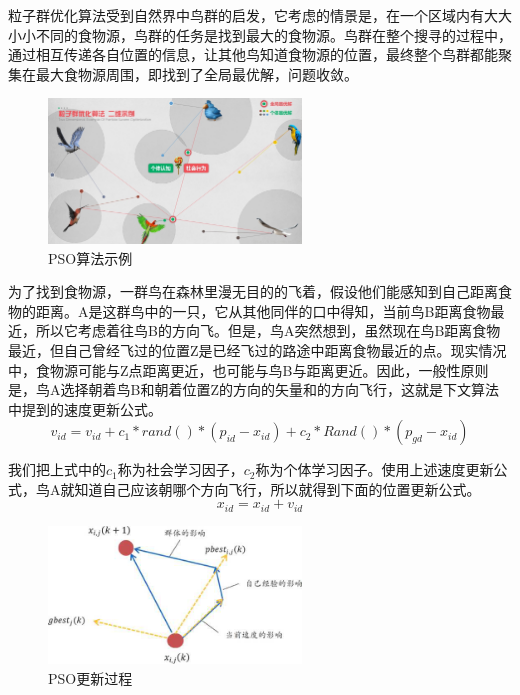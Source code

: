 \documentclass[lang=cn,12pt,a4paper,cite=authoryear]{elegantpaper}
\begin{document}
粒子群优化算法受到自然界中鸟群的启发，它考虑的情景是，在一个区域内有大大小小不同的食物源，鸟群的任务是找到最大的食物源。鸟群在整个搜寻的过程中，通过相互传递各自位置的信息，让其他鸟知道食物源的位置，最终整个鸟群都能聚集在最大食物源周围，即找到了全局最优解，问题收敛。


\begin{figure}[H]
	\centering
	\includegraphics[width=0.6\textwidth]{image/psointro.png}
	\caption{PSO算法示例}
	\label{psointro}
\end{figure}





为了找到食物源，一群鸟在森林里漫无目的的飞着，假设他们能感知到自己距离食物的距离。A是这群鸟中的一只，它从其他同伴的口中得知，当前鸟B距离食物最近，所以它考虑着往鸟B的方向飞。但是，鸟A突然想到，虽然现在鸟B距离食物最近，但自己曾经飞过的位置Z是已经飞过的路途中距离食物最近的点。现实情况中，食物源可能与Z点距离更近，也可能与鸟B与距离更近。因此，一般性原则是，鸟A选择朝着鸟B和朝着位置Z的方向的矢量和的方向飞行，这就是下文算法中提到的速度更新公式。
$$v_{id} = v_{id} + c_1 * rand() * (p_{id} - x_{id}) + c_2 * Rand() * (p_{gd} - x_{id})$$

我们把上式中的$c_1$称为社会学习因子，$c_2$称为个体学习因子。使用上述速度更新公式，鸟A就知道自己应该朝哪个方向飞行，所以就得到下面的位置更新公式。
$$x_{id} = x_{id} + v_{id}$$


\begin{figure}[H]
	\centering
	\includegraphics[width=0.6\textwidth]{image/pso_algorithm.png}
	\caption{PSO更新过程}
	\label{psointro}
\end{figure}
\end{document}
